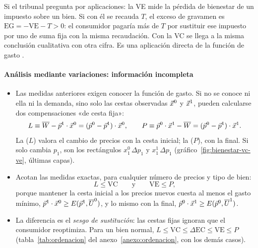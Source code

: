 \documentclass[11pt]{article}
\begin{document}
\begin{notaopositor}
Si el tribunal pregunta por aplicaciones: la VE mide la pérdida de bienestar de un impuesto sobre un bien. Si con él se recauda $T$, el exceso de gravamen es $\mathrm{EG}=-\mathrm{VE}-T>0$: el consumidor pagaría más de $T$ por sustituir ese impuesto por uno de suma fija con la misma recaudación\nocite{MasColellWhinstonGreen1995}. Con la VC se llega a la misma conclusión cualitativa con otra cifra. Es una aplicación directa de la función de gasto .
\end{notaopositor}

\paragraph{Análisis mediante variaciones: información incompleta}

\begin{itemize}
\item Las medidas anteriores exigen conocer la función de gasto. Si no se conoce ni ella ni la demanda, sino solo las cestas observadas $\vec{x}^0$ y $\vec{x}^1$, pueden calcularse dos compensaciones «de cesta fija»:
  \begin{equation}
  L\equiv\overline{W}-\vec{p}^1\cdot\vec{x}^0=(\vec{p}^0-\vec{p}^1)\cdot\vec{x}^0,\qquad P\equiv\vec{p}^0\cdot\vec{x}^1-\overline{W}=(\vec{p}^0-\vec{p}^1)\cdot\vec{x}^1. \label{eq:var-laspeyres-paasche}
  \end{equation}
  La  ($L$) valora el cambio de precios con la cesta inicial; la  ($P$), con la final. Si solo cambia $p_1$, son los rectángulos $x_1^0\,\Delta p_1$ y $x_1^1\,\Delta p_1$ (gráfico~\ref{fig:bienestar-vc-ve}, últimas capas).
\item Acotan las medidas exactas, para cualquier número de precios y tipo de bien:
  \begin{equation}
  L\leq \mathrm{VC}\qquad\text{y}\qquad \mathrm{VE}\leq P, \label{eq:cotas-lp}
  \end{equation}
  porque mantener la cesta inicial a los precios nuevos cuesta al menos el gasto mínimo, $\vec{p}^1\cdot\vec{x}^0\geq E(\vec{p}^1,\overline{U}^0)$, y lo mismo con la final, $\vec{p}^0\cdot\vec{x}^1\geq E(\vec{p}^0,\overline{U}^1)$.\findemo
\item La diferencia es el \emph{sesgo de sustitución}: las cestas fijas ignoran que el consumidor reoptimiza. Para un bien normal, $L\leq \mathrm{VC}\leq\Delta\mathrm{EC}\leq \mathrm{VE}\leq P$ (tabla~\ref{tab:ordenacion} del anexo~\ref{anexo:ordenacion}, con los demás casos).
\end{itemize}
\end{document}
